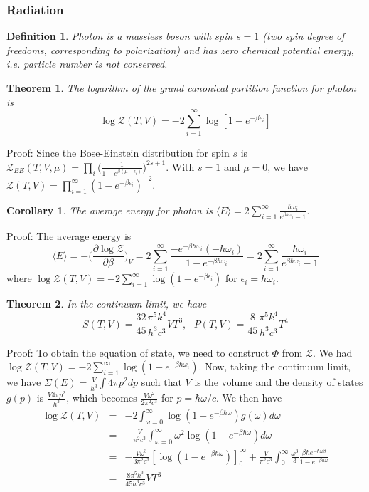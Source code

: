 \documentclass[a4paper]{article}
\theoremstyle{new}
\newtheorem{defi}{Definition}[section]
\newtheorem{thm}{Theorem}[section]
\newtheorem{cor}{Corollary}[section]
\begin{document}
\subsubsection*{Radiation}
\begin{defi}
Photon is a massless boson with spin $s=1$ (two spin degree of freedoms, corresponding to polarization) and has zero chemical potential energy, i.e. particle number is not conserved.
\end{defi}
\begin{thm}
The logarithm of the grand canonical partition function for photon is
$$\log\mathcal{Z}(T,V)=-2\sum_{i=1}^\infty\log[1-e^{-\beta\epsilon_i}]$$
\end{thm}
Proof: Since the Bose-Einstein distribution for spin $s$ is $\mathcal{Z}_{BE}(T,V,\mu)=\prod_i\bigg(\frac{1}{1-e^{\beta(\mu-\epsilon_i)}}\bigg)^{2s+1}$. With $s=1$ and $\mu=0$, we have $\mathcal{Z}(T,V)=\prod_{i=1}^\infty(1-e^{-\beta\epsilon_i})^{-2}$. 
\begin{cor}
The average energy for photon is $\langle E\rangle=2\sum_{i=1}^\infty\frac{\hbar\omega_i}{e^{\beta\hbar\omega_i}-1}$.
\end{cor}
Proof: The average energy is 
$$\langle E\rangle=-\bigg(\frac{\partial\log\mathcal{Z}}{\partial\beta}\bigg)_V=2\sum_{i=1}^\infty\frac{-e^{-\beta\hbar\omega_i}(-\hbar\omega_i)}{1-e^{-\beta\hbar\omega_i}}=2\sum_{i=1}^\infty\frac{\hbar\omega_i}{e^{\beta\hbar\omega_i}-1}$$
where $\log\mathcal{Z}(T,V)=-2\sum_{i=1}^\infty\log(1-e^{-\beta\epsilon_i})$ for $\epsilon_i=\hbar\omega_i$. 
\begin{thm}
In the continuum limit, we have
$$S(T,V)=\frac{32}{45}\frac{\pi^5k^4}{h^3c^3}VT^3,\text{    }P(T,V)=\frac{8}{45}\frac{\pi^5k^4}{h^3c^3}T^4$$
\end{thm}
Proof: To obtain the equation of state, we need to construct $\Phi$ from $\mathcal{Z}$. We had $\log\mathcal{Z}(T,V)=-2\sum_{i=1}^\infty\log(1-e^{-\beta\hbar\omega_i})$. Now, taking the continuum limit, we have $\Sigma(E)=\frac{V}{h^3}\int 4\pi p^2dp$ such that $V$ is the volume and the density of states $g(p)$ is $\frac{V4\pi p^2}{h^3}$, which becomes $\frac{V\omega^2}{2\pi^2c^3}$ for $p=\hbar\omega/c$. We then have
\begin{eqnarray}
\log\mathcal{Z}(T,V)&=&-2\int_{\omega=0}^\infty\log(1-e^{-\beta\hbar\omega})g(\omega)d\omega\nonumber\\&=&-\frac{V}{\pi^2c^3}\int_{\omega=0}^\infty \omega^2\log(1-e^{-\beta\hbar\omega})d\omega\nonumber\\&=&-\frac{V\omega^3}{3\pi^2c^3}[\log(1-e^{-\beta\hbar\omega})]^\infty_0+\frac{V}{\pi^2c^3}\int_0^\infty\frac{\omega^3}{3}\frac{\beta\hbar e^{-\hbar\omega\beta}}{1-e^{-\beta\hbar\omega}}\nonumber\\&=&\frac{8\pi^5k^3}{45h^3c^3}VT^3\nonumber
\end{eqnarray}
\end{document}
